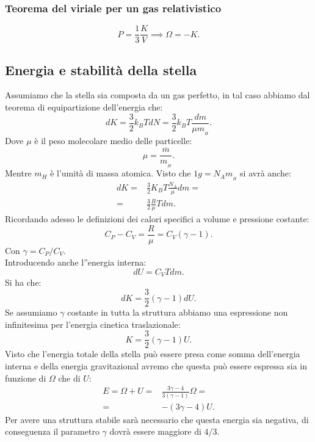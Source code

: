 \subsubsection{Teorema del viriale per un gas relativistico}
\label{subsubsec:Teorema del viriale per un gas relativistico}
\[
	P = \frac{1}{3}\frac{K}{V} \implies \Omega  = -K
.\] 
\subsection{Energia e stabilità della stella}
\label{subsec:Energia e stabilità della stella}
Assumiamo che la stella sia composta da un gas perfetto, in tal caso abbiamo dal teorema di equipartizione dell'energia che:
\[
	dK = \frac{3}{2}k_B TdN = \frac{3}{2}k_B T \frac{dm}{\mu m_{_H}}
.\] 
Dove $\mu$ è il peso molecolare medio delle particelle:
\[
	\mu  = \frac{\overline{m}}{m_{_H}}
.\] 
Mentre $m_H$ è l'umità di massa atomica. Visto che  $1g=N_Am_{_H}$ si avrà anche:
\[\begin{aligned}
	dK 
	=&
	\frac{3}{2}K_BT \frac{N_A}{\mu}dm =\\
	=& \frac{3}{2}\frac{R}{\mu}Tdm
.\end{aligned}\]
Ricordando adesso le definizioni dei calori specifici a volume e pressione costante:
\[
	C_{P} - C_{V} = \frac{R}{\mu}= C_V \left( \gamma-1 \right) 
.\] 
Con $\gamma=C_P/C_V$.\\
Introducendo anche l''energia interna: \[
	dU = C_V Tdm
.\] 
Si ha che: 
\[
	dK = \frac{3}{2}\left( \gamma-1 \right) dU
.\] 
Se assumiamo $\gamma$ costante in tutta la struttura abbiamo una espressione non infinitesima per l'energia cinetica traslazionale: 
\[
	K = \frac{3}{2}\left( \gamma  - 1 \right) U
.\] 
Visto che l'energia totale della stella può essere presa come somma dell'energia interna e della energia gravitazional avremo che questa può essere espressa sia in funzione di $\Omega$ che di $U$:
\[\begin{aligned}
	E = \Omega+U =&
	\frac{3\gamma-4}{3\left( \gamma-1 \right) }\Omega=\\
	=&- \left( 3\gamma-4 \right) U
.\end{aligned}\]
Per avere una struttura stabile sarà necessario che questa energia sia negativa, di conseguenza il parametro $\gamma$ dovrà essere maggiore di $4/3$.
